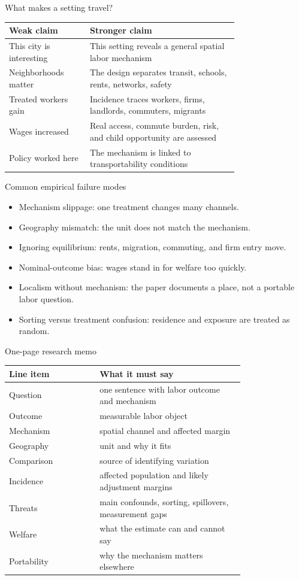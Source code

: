 \documentclass[aspectratio=169,11pt]{beamer}
\begin{document}
\begin{frame}{What makes a setting travel?}
\small
\begin{tabular}{p{0.26\linewidth} p{0.50\linewidth}}
\toprule
Weak claim & Stronger claim \\
\midrule
This city is interesting & This setting reveals a general spatial labor mechanism \\
Neighborhoods matter & The design separates transit, schools, rents, networks, safety \\
Treated workers gain & Incidence traces workers, firms, landlords, commuters, migrants \\
Wages increased & Real access, commute burden, risk, and child opportunity are assessed \\
Policy worked here & The mechanism is linked to transportability conditions \\
\bottomrule
\end{tabular}
\end{frame}

\begin{frame}{Common empirical failure modes}
\begin{itemize}
    \item Mechanism slippage: one treatment changes many channels.
    \item Geography mismatch: the unit does not match the mechanism.
    \item Ignoring equilibrium: rents, migration, commuting, and firm entry move.
    \item Nominal-outcome bias: wages stand in for welfare too quickly.
    \item Localism without mechanism: the paper documents a place, not a portable labor question.
    \item Sorting versus treatment confusion: residence and exposure are treated as random.
\end{itemize}
\end{frame}

\begin{frame}{One-page research memo}
\small
\begin{tabular}{p{0.30\linewidth} p{0.48\linewidth}}
\toprule
Line item & What it must say \\
\midrule
Question & one sentence with labor outcome and mechanism \\
Outcome & measurable labor object \\
Mechanism & spatial channel and affected margin \\
Geography & unit and why it fits \\
Comparison & source of identifying variation \\
Incidence & affected population and likely adjustment margins \\
Threats & main confounds, sorting, spillovers, measurement gaps \\
Welfare & what the estimate can and cannot say \\
Portability & why the mechanism matters elsewhere \\
\bottomrule
\end{tabular}
\end{frame}
\end{document}
